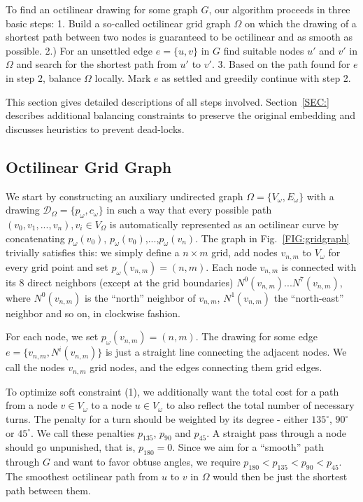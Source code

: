 \documentclass{sig-alternate-sigmod09}
\begin{document}
To find an octilinear drawing for some graph $G$, our algorithm proceeds in three basic steps: 1. Build a so-called octilinear grid graph $\Omega$ on which the drawing of a shortest path between two nodes is guaranteed to be octilinear and as smooth as possible. 2.) For an unsettled edge $e = \{u, v\}$ in $G$ find suitable nodes $u'$ and $v'$ in $\Omega$ and search for the shortest path from $u'$ to $v'$. 3. Based on the path found for $e$ in step 2, balance $\Omega$ locally. Mark $e$ as settled and greedily continue with step 2.

This section gives detailed descriptions of all steps involved. Section~\ref{SEC:} describes additional balancing constraints to preserve the original embedding and discusses heuristics to prevent dead-locks.

\subsection{Octilinear Grid Graph}

We start by constructing an auxiliary undirected graph $\Omega = \{V_\omega, E_\omega\}$ with a drawing $\mathcal{D}_\Omega = \{p_\omega, c_\omega\}$ in such a way that every possible path $(v_0, v_1, ..., v_n), v_i \in V_\Omega$ is automatically represented as an octilinear curve by concatenating $p_\omega(v_0)$, $p_\omega(v_0)$,$...$,$p_\omega(v_n)$. The graph in Fig.~\ref{FIG:gridgraph} trivially satisfies this: we simply define a $n\times m$ grid, add nodes $v_{n,m}$ to $V_\omega$ for every grid point and set $p_\omega(v_{n,m}) = (n, m)$. Each node $v_{n,m}$ is connected with its 8 direct neighbors (except at the grid boundaries) $N^0(v_{n,m}) ... N^7(v_{n, m})$, where $N^0(v_{n,m})$ is the ``north'' neighbor of $v_{n, m}$,  $N^1(v_{n,m})$ the ``north-east'' neighbor and so on, in clockwise fashion.

For each node, we set $p_\omega(v_{n, m}) = (n, m)$. The drawing for some edge $e = \{v_{n, m}, N^i(v_{n, m})\}$ is just a straight line connecting the adjacent nodes. We call the nodes $v_{n, m}$ grid nodes, and the edges connecting them grid edges.

To optimize soft constraint (1), we additionally want the total cost for a path from a node $v \in V_\omega$ to a node $u \in V_\omega$ to also reflect the total number of necessary turns. The penalty for a turn should be weighted by its degree - either $135^{\circ}$, $90^{\circ}$ or $45^{\circ}$. We call these penalties $p_{135}$, $p_{90}$ and $p_{45}$. A straight pass through a node should go unpunished, that is, $p_{180} = 0$. Since we aim for a ``smooth'' path through $G$ and want to favor obtuse angles, we require $p_{180} < p_{135} < p_{90} < p_{45}$. The smoothest octilinear path from $u$ to $v$ in $\Omega$ would then be just the shortest path between them.
\end{document}
